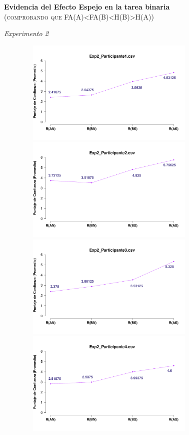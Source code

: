 \documentclass[a4paper ]{article}
\begin{document}
\begin{center}
{\LARGE \textbf{Evidencia del Efecto Espejo en la tarea binaria}}\\
{\small \textsc{(comprobando que FA(A)<FA(B)<H(B)>H(A))}}\\
\smallskip
\end{center}
\begin{center}
{\LARGE \textit{Experimento 2}}\\
\end{center}
\vspace{3mm}
\begin{figure}[th]
\centering
\includegraphics[width=9cm, height=5cm]{Figures/MirrorRating_Exp2_P1} \includegraphics[width=9cm, height=5cm]{Figures/MirrorRating_Exp2_P2} 
\includegraphics[width=9cm, height=5cm]{Figures/MirrorRating_Exp2_P3} \includegraphics[width=9cm, height=5cm]{Figures/MirrorRating_Exp2_P4} 

\end{figure}
\end{document}
